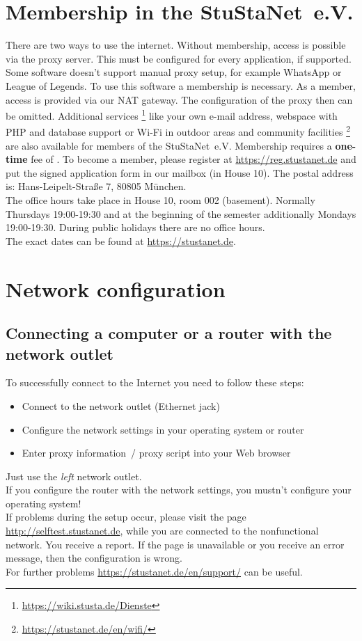 \documentclass[a4paper,12pt]{scrartcl}
\begin{document}
\section*{Membership in the StuStaNet~e.V.}
There are two ways to use the internet. Without membership, access is possible via the proxy server. This must be configured for every application, if supported. Some software doesn't support manual proxy setup, for example WhatsApp or League of Legends. To use this software a membership is necessary.
\pagebreak\linebreak
As a member, access is provided via our NAT gateway. The configuration of the proxy then can be omitted. Additional services \footnote{\url{https://wiki.stusta.de/Dienste}} like your own e-mail address, webspace with PHP and database support or Wi-Fi in outdoor areas and community facilities \footnote{\url{https://stustanet.de/en/wifi/}} are also available for members of the StuStaNet~e.V. Membership requires a \textbf{one-time} fee of . To become a member, please register at \mbox{\url{https://reg.stustanet.de}} and put the signed application form in our mailbox (in House 10). The postal address is: Hans-Leipelt-Straße 7, 80805 München.
\\
The office hours take place in House 10, room 002 (basement). Normally Thursdays 19:00-19:30 and at the beginning of the semester additionally Mondays 19:00-19:30. During public holidays there are no office hours.
\\
The exact dates can be found at \mbox{\url{https://stustanet.de}}.


\section*{Network configuration}
\subsection*{Connecting a computer or a router with the network outlet}

To successfully connect to the Internet you need to follow these steps:
\begin{itemize}
    \item Connect to the network outlet (Ethernet jack)
    \item Configure the network settings in your operating system or router
    \item Enter proxy information~/ proxy script into your Web browser
\end{itemize}
Just use the \emph{left} network outlet.\\
If you configure the router with the network settings, you mustn't configure your operating system!\\
If problems during the setup occur, please visit the page \mbox{\url{http://selftest.stustanet.de}}, while you are connected to the nonfunctional network. You receive a report. If the page is unavailable or you receive an error message, then the configuration is wrong.\\
For further problems \mbox{\url{https://stustanet.de/en/support/}} can be useful.
\end{document}

